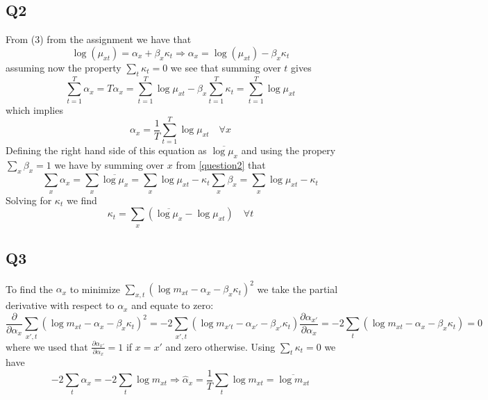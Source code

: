 \documentclass[11pt]{article}
\begin{document}
\subsection*{Q2}

From (3) from the assignment we have that
\begin{equation}
\log(\mu_{xt}) = \alpha_x + \beta_x \kappa_t \Rightarrow \alpha_x = \log(\mu_{xt}) - \beta_x \kappa_t \label{question2}
\end{equation}
assuming now the property $\sum_t \kappa_t = 0$  we see that summing over $t$ gives
\begin{equation}
\sum_{t=1}^T \alpha_x = T \alpha_x = \sum_{t=1}^T \log \mu_{xt} - \beta_x \sum_{t=1}^T \kappa_t = \sum_{t=1}^T \log \mu_{xt} 
\end{equation}
which implies 
\begin{equation}
\alpha_x = \frac{1}{T} \sum_{t=1}^T \log \mu_{xt} \quad \forall x
\end{equation}
Defining the right hand side of this equation as $\overline{ \log \mu_x}$ and using the propery $\sum_x \beta_x = 1$ we have by summing over $x$ from \eqref{question2} that
\begin{equation}
\sum_x \alpha_x = \sum_x \overline{\log \mu_x} = \sum_x \log \mu_{xt} - \kappa_t \sum_x \beta_x
		= \sum_x \log \mu_{xt} - \kappa_t
\end{equation}
Solving for $\kappa_t$ we find
\begin{equation}
\kappa_t = \sum_x ( \overline{\log \mu_x} - \log \mu_{xt}) \quad \forall t
\end{equation}

\subsection*{Q3}

To find the $\alpha_x$ to minimize $\sum_{x,t} (\log m_{xt} - \alpha_x - \beta_x\kappa_t)^2$ we take the partial derivative with respect to $\alpha_x$ and equate to zero:
\begin{equation}
\frac{\partial}{\partial \alpha_x} \sum_{x',t} (\log m_{xt} - \alpha_x - \beta_x\kappa_t)^2
 = -2 \sum_{x',t} (\log m_{x't} - \alpha_{x'} - \beta_{x'} \kappa_t) \frac{\partial \alpha_{x'}}{\partial \alpha_{x}} = -2 \sum_t \left ( \log m_{xt} - \alpha_x - \beta_x \kappa_t \right ) = 0
\end{equation}
where we used that $\frac{\partial \alpha_{x'}}{\partial \alpha_{x}} = 1$ if $x = x'$ and zero otherwise. Using $\sum_t \kappa_t = 0$ we have
\begin{equation}
-2 \sum_t \alpha_x = -2 \sum_t \log m_{xt} \Rightarrow \hat{\alpha}_x = \frac{1}{T} \sum_t \log m_{xt} = \overline {\log m_{xt}}
\end{equation}
\end{document}
